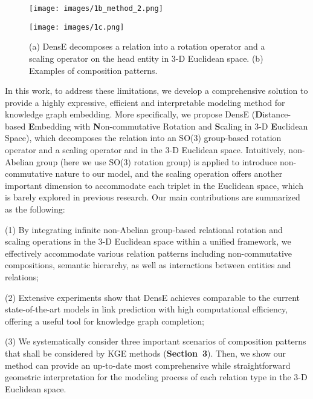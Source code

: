 \documentclass[11pt]{article}
\begin{document}
\begin{figure*}[!ht]
\centering     \begin{minipage}{9.0cm}
\centering
\texttt{[image: images/1b\_method\_2.png]}
\subcaption{}
\end{minipage}
\begin{minipage}{6.0cm}
\centering
\texttt{[image: images/1c.png]}
\subcaption{}
\end{minipage}
\caption{(a) DensE decomposes a relation into a rotation operator and a scaling operator on the head entity  in 3-D Euclidean space. (b) Examples of composition patterns.}
\label{comparison diffpool and graphstar}
\end{figure*}

In this work, to address these limitations, we develop a comprehensive solution to provide a highly expressive, efficient and interpretable modeling method for knowledge graph embedding. More specifically, we propose DensE (\textbf{D}istance-based \textbf{E}mbedding with \textbf{N}on-commutative Rotation and \textbf{S}caling in 3-D \textbf{E}uclidean Space), which decomposes the relation into an SO(3) group-based rotation operator and a scaling operator and in the 3-D Euclidean space. Intuitively, non-Abelian group (here we use SO(3) rotation group) is applied to introduce non-commutative nature to our model, and the scaling operation offers another important dimension to accommodate each triplet in the Euclidean space, which is barely explored in previous research. Our main contributions are summarized as the following: 

(1) By integrating infinite non-Abelian group-based relational rotation and scaling operations in the 3-D Euclidean space within a unified framework, we effectively accommodate various relation patterns including non-commutative compositions, semantic hierarchy, as well as interactions between entities and relations;

(2) Extensive experiments show that DensE achieves comparable to the current state-of-the-art models in link prediction with high computational efficiency, offering a useful tool for knowledge graph completion;

(3) We systematically consider three important scenarios of composition patterns that shall be considered by KGE methods (\textbf{Section~3}). Then, we show our method can provide an up-to-date most comprehensive while straightforward geometric interpretation for the modeling process of each relation type in the 3-D Euclidean space.
\end{document}
